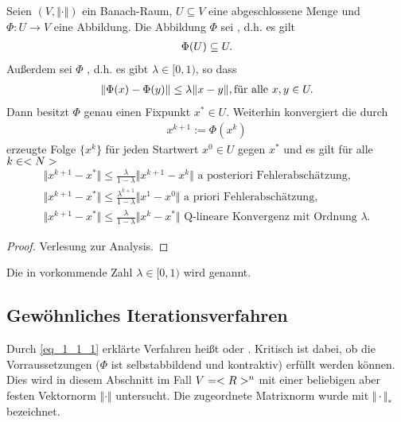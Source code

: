 \begin{proposition}[Banach]
	Seien $(V, \Vert \cdot \Vert)$ ein Banach-Raum, $U \subseteq V$ eine abgeschlossene Menge und $\Phi: U \to V$ eine Abbildung. Die Abbildung $\Phi$ sei , d.h. es gilt
	\begin{align}
		\Phi(U) \subseteq U.\notag
	\end{align}
	Außerdem sei $\Phi$ , d.h. es gibt $\lambda \in [0,1)$, so dass
	\begin{align}
		\Vert\Phi(x) - \Phi(y)\Vert \le \lambda \Vert x-y\Vert, \text{für alle } x,y \in U.\notag
	\end{align}
	Dann besitzt $\Phi$ genau einen Fixpunkt $x^{*} \in U$. Weiterhin konvergiert die durch
	\begin{align}
		x^{k+1} := \Phi(x^k) \label{eq_1_1_1}
	\end{align}
	erzeugte Folge $\{x^k\}$ für jeden Startwert $x^0 \in U$ gegen $x^{*}$ und es gilt für alle $k \in <N>$
	\begin{align}
		\Vert x^{k+1} - x^{*}\Vert \le \frac{\lambda}{1 - \lambda}\Vert x^{k+1} - x^k\Vert \text{ a posteriori Fehlerabschätzung},\\
		\Vert x^{k+1} - x^{*}\Vert \le \frac{\lambda^{k+1}}{1 - \lambda}\Vert x^1 - x^0\Vert \text{ a priori Fehlerabschätzung},\\
		\Vert x^{k+1} - x^{*}\Vert \le \frac{\lambda}{1 - \lambda}\Vert x^{k} - x^{*}\Vert \text{ Q-lineare Konvergenz mit Ordnung }\lambda.
	\end{align}
\end{proposition}

\begin{proof}
	Verlesung zur Analysis.
\end{proof}

Die in  vorkommende Zahl $\lambda \in [0,1)$ wird  genannt. 

\subsection{Gewöhnliches Iterationsverfahren}

Durch \ref{eq_1_1_1} erklärte Verfahren heißt  oder . Kritisch ist dabei, ob die Vorraussetzungen ($\Phi$ ist selbstabbildend und kontraktiv) erfüllt werden können. Dies wird in diesem Abschnitt im Fall $V = <R>^n$ mit einer beliebigen aber festen Vektornorm $\Vert \cdot \Vert$ untersucht. Die zugeordnete Matrixnorm wurde mit $\Vert \cdot \Vert_{\ast}$ bezeichnet.

